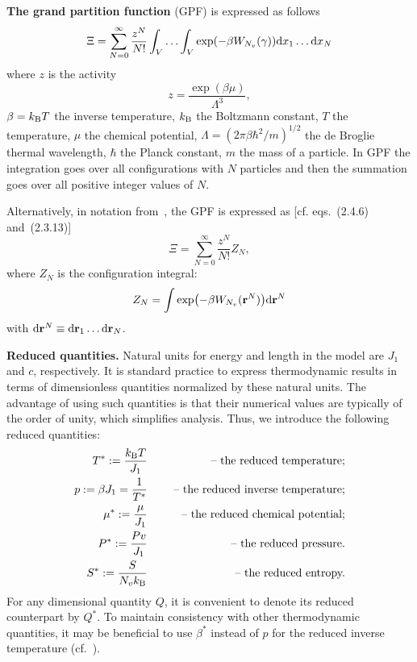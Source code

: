 \documentclass[12pt]{article}
\numberwithin{equation}{section}
\begin{document}
	\textbf{The grand partition function} (GPF) is expressed as follows~\cite[eqs.~(2.4.6) and~(2.3.13)]{HansenMcDonald13}
	\begin{equation*}
		\Xi = \sum_{N=0}^{\infty}\frac{z^N}{N!} \int_{V} \dotsc \int_{V} \exp(-\beta W_{N_v}(\gamma)) {\rm d} x_1 \dotsc {\rm d} x_N
	\end{equation*}
	where $z$ is the activity
	\begin{equation*}
		z = \frac{\exp(\beta \mu)}{\Lambda^3},
	\end{equation*}
	$\beta = k_{\rm B} T$ the inverse temperature, $k_{\rm B}$ the Boltzmann constant, $T$ the temperature, $\mu$ the chemical potential, $\Lambda = (2\pi\beta\hbar^2/m)^{1/2}$ the de Broglie thermal wavelength, $\hbar$ the Planck constant, $m$ the mass of a particle. In GPF the integration goes over all configurations with $N$ particles and then the summation goes over all positive integer values of $N$.
	
	\begin{mdframed}[linecolor=black,linewidth=1pt,leftline=true]
		Alternatively, in notation from~\cite{HansenMcDonald13}, the GPF is expressed as [cf. eqs.~(2.4.6) and~(2.3.13)]
		\begin{equation}
			\Xi=\sum_{N=0}^{\infty}\frac{z^N}{N!}Z_N,
		\end{equation}
		where $Z_N$ is the configuration integral:
		\begin{equation}
			Z_N = \int\exp(-\beta W_{N_v}(\vb{r}^N)){\rm d}\vb{r}^N
		\end{equation}
		with ${\rm d} \vb{r}^N \equiv {\rm d}{\vb r_1} \dotsc {\rm d}{\vb r_N}$.
	\end{mdframed}
	
	\textbf{Reduced quantities.} Natural units for energy and length in the model are $J_1$ and $c$, respectively. It is standard practice to express thermodynamic results in terms of dimensionless quantities normalized by these natural units. The advantage of using such quantities is that their numerical values are typically of the order of unity, which simplifies analysis. Thus, we introduce the following reduced quantities: 
	\begin{eqnarray*}
		T^* := \frac{k_{\rm B} T}{J_1} & \quad & \text{ -- the reduced temperature;} 
		\\
		p := \beta J_1 = \frac{1}{T^*} & \quad & \text{ -- the reduced inverse temperature;}
		\\
		\mu^* := \frac{\mu}{J_1} & \quad & \text{ -- the reduced chemical potential;}
		\\ 
		P^* := \frac{Pv}{J_1} & & \text{ -- the reduced pressure.}
		\\
		S^* := \frac{S}{N_v k_{\rm B}} & & \text{ -- the reduced entropy.}
	\end{eqnarray*}
	For any dimensional quantity $Q$, it is convenient to denote its reduced counterpart by $Q^*$. To maintain consistency with other thermodynamic quantities, it may be beneficial to use $\beta^*$ instead of $p$ for the reduced inverse temperature (cf.~\cite{RDGMR13}).
	
\end{document}
